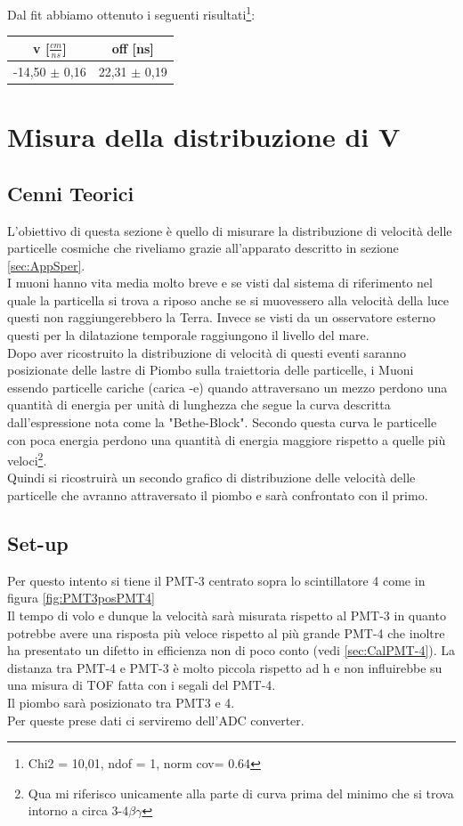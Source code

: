 \documentclass[a4paper]{article}
\begin{document}
Dal fit abbiamo ottenuto i seguenti risultati\footnote{Chi2 = 10,01, ndof = 1, norm cov= 0.64}:

\begin{tabular}{|c|c|}
\hline
v [$\frac{cm}{ns}$] & off [ns] \\
\hline
-14,50 $\pm$ 0,16 & 22,31 $\pm$ 0,19\\
\hline
\end{tabular}

\section{Misura della distribuzione di V}
\label{sec:MisuraVMu}
\subsection{Cenni Teorici}
L'obiettivo di questa sezione è quello di misurare la distribuzione di velocità delle particelle cosmiche che riveliamo grazie all'apparato descritto in sezione \ref{sec:AppSper}.\\
I muoni hanno vita media molto breve e se visti dal sistema di riferimento nel quale la particella si trova a riposo anche se si muovessero alla velocità della luce questi non raggiungerebbero la Terra. Invece se visti da un osservatore esterno questi per la dilatazione temporale raggiungono il livello del mare.\\
Dopo aver ricostruito la distribuzione di velocità di questi eventi saranno posizionate delle lastre di Piombo sulla traiettoria delle particelle, i Muoni essendo particelle cariche (carica -e) quando attraversano un mezzo perdono una quantità di energia per unità di lunghezza che segue la curva descritta dall'espressione nota come la "Bethe-Block". Secondo questa curva le particelle con poca energia perdono una quantità di energia maggiore rispetto a quelle più veloci\footnote{Qua mi riferisco unicamente alla parte di curva prima del minimo che si trova intorno a circa 3-4$\beta \gamma$}.\\
Quindi si ricostruirà un secondo grafico di distribuzione delle velocità delle particelle che avranno attraversato il piombo e sarà confrontato con il primo.
\subsection{Set-up}
Per questo intento si tiene il PMT-3 centrato sopra lo scintillatore 4 come in figura \ref{fig:PMT3posPMT4}\\
Il tempo di volo e dunque la velocità sarà misurata rispetto al PMT-3 in quanto potrebbe avere una risposta più veloce rispetto al più grande PMT-4 che inoltre ha presentato un difetto in efficienza non di poco conto (vedi \ref{sec:CalPMT-4}). La distanza tra PMT-4 e PMT-3 è molto piccola rispetto ad h e non influirebbe su una misura di TOF fatta con i segali del PMT-4.\\
Il piombo sarà posizionato tra PMT3 e 4.\\
Per queste prese dati ci serviremo dell'ADC converter.
\end{document}
